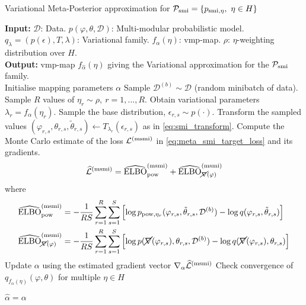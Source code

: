 \begin{algorithm}[tbh]
  \caption{Variational Meta-Posterior approximation for $\mathcal{P}_{\operatorname{\text{smi}}}=\{p_{\operatorname{\text{smi}},\eta},\ \eta\in H\}$} \label{alg:v_meta_smi}
  \begin{algorithmic}
    \STATE \textbf{Input:} $\mathcal{D}$: Data. $p(\varphi,\theta,\mathcal{D})$: Multi-modular probabilistic model. $q_\lambda=(p(\epsilon), T, \lambda)$: Variational family. $f_{\alpha}(\eta)$: \acrshort*{vmp}-map. $\rho$: $\eta$-weighting distribution over $H$. \\[0.1in]
    \STATE \textbf{Output:} \acrshort{vmp}-map $f_{\hat\alpha}(\eta)$ giving the Variational approximation for the $\mathcal{P}_{\operatorname{\text{smi}}}$ family.\\[0.1in]

    \STATE Initialise mapping parameters $\alpha$
    \STATE Sample $\mathcal{D}^{(b)} \sim \mathcal{D}$ (random minibatch of data).
    \STATE Sample $R$ values of $\eta_{r}\sim \rho,\ r=1,...,R$.
    \STATE Obtain variational parameters $\lambda_r = f_{\alpha}(\eta_r)$.
    \STATE Sample the base distribution, $\epsilon_{r,s} \sim p(\cdot)$.
    \STATE Transform the sampled values $(\varphi_{r,s}, \theta_{r,s}, \tilde\theta_{r,s}) \leftarrow T_{\lambda_r}(\epsilon_{r,s})$ as in \cref{eq:smi_transform}.
    \ENDFOR
    \ENDFOR
    \STATE Compute the Monte Carlo estimate of the loss $\mathcal{L}^{( \operatorname{\text{msmi}})}$ in \cref{eq:meta_smi_target_loss} and its gradients.
    \begin{equation}
      \widehat{\mathcal{L}}^{(\operatorname{\text{msmi}})} = \widehat{\operatorname{\text{ELBO}}}_{\operatorname{\text{pow}}}^{(\operatorname{\text{msmi}})} + \widehat{\operatorname{\text{ELBO}}}_{\cancel{\nabla}(\varphi)}^{(\operatorname{\text{msmi}})}
    \end{equation}
    where
    \begin{align}
      \widehat{\operatorname{\text{ELBO}}}_{\operatorname{\text{pow}}}^{(\operatorname{\text{msmi}})}                     & = - \frac{1}{RS} \sum_{r=1}^{R}\sum_{s=1}^{S} \left[ \log p_{\operatorname{\text{pow}}, \eta_r}(\varphi_{r,s}, \tilde\theta_{r,s}, \mathcal{D}^{(b)}) - \log q(\varphi_{r,s}, \tilde\theta_{r,s}) \right]         \\
      \widehat{\operatorname{\text{ELBO}}}_{\cancel{\nabla}(\varphi)}^{(\operatorname{\text{msmi}})} & = - \frac{1}{RS} \sum_{r=1}^{R}\sum_{s=1}^{S} \left[ \log p(\cancel{\nabla}(\varphi_{r,s}), \theta_{r,s}, \mathcal{D}^{(b)}) - \log q( \cancel{\nabla}(\varphi_{r,s}), \theta_{r,s}) \right]
    \end{align}
    \STATE Update $\alpha$ using the estimated gradient vector $\nabla_{\alpha}\widehat{\mathcal{L}}^{(\operatorname{\text{msmi}})}$
    \STATE Check convergence of $q_{f_{\alpha}(\eta)}(\varphi,\theta)$ for multiple $\eta \in H$
    \ENDWHILE

    \RETURN $\hat\alpha=\alpha$ %

  \end{algorithmic}
\end{algorithm}


